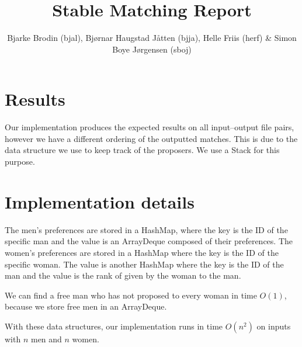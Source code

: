 \documentclass{tufte-handout}
\title{Stable Matching Report}
\author{Bjarke Brodin (bjal), Bjørnar Haugstad Jåtten (bjja), Helle Friis (herf) & Simon Boye Jørgensen (sboj)}
\begin{document}
  \maketitle

  \section{Results}

  Our implementation produces the expected results on all input--output file pairs, however we have a different ordering of the outputted matches.
  This is due to the data structure we use to keep track of the proposers. We use a Stack for this purpose.

  \section{Implementation details}

  The men's preferences are stored in a HashMap, where the key is the ID of the specific man and the value is an ArrayDeque composed of their preferences.
  The women's preferences are stored in a HashMap where the key is the ID of the specific woman. 
  The value is another HashMap where the key is the ID of the man and the value is the rank of given by the woman to the man.

  We can find a free man who has not proposed to every woman in time $O(1)$,
  because we store free men in an ArrayDeque.

  With these data structures, our implementation runs in time $O(n^2)$ on inputs with $n$ men and $n$ women.
\end{document}
